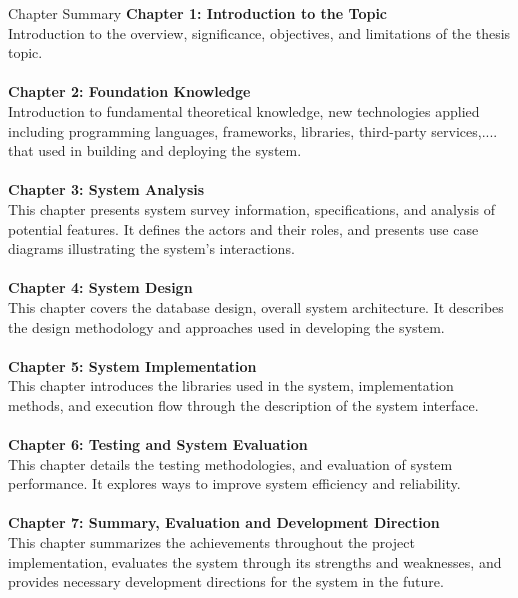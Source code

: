 \begin{preface}{Chapter Summary}
  \textbf{Chapter 1: Introduction to the Topic}
  \\
  Introduction to the overview, significance, objectives, and limitations of the thesis topic.
  \\
  \\
  \textbf{Chapter 2: Foundation Knowledge}
  \\
  Introduction to fundamental theoretical knowledge, new technologies applied including programming languages, frameworks, libraries, third-party services,.... that used in building and deploying the system.
  \\
  \\
  \textbf{Chapter 3: System Analysis}
  \\
  This chapter presents system survey information, specifications, and analysis of potential features. It defines the actors and their roles, and presents use case diagrams illustrating the system's interactions.
  \\
  \\
  \textbf{Chapter 4: System Design}
  \\
  This chapter covers the database design, overall system architecture. It describes the design methodology and approaches used in developing the system.
  \\
  \\
  \textbf{Chapter 5: System Implementation}
  \\
  This chapter introduces the libraries used in the system, implementation methods, and execution flow through the description of the system interface.
  \\
  \\
  \textbf{Chapter 6: Testing and System Evaluation}
  \\
  This chapter details the testing methodologies, and evaluation of system performance. It explores ways to improve system efficiency and reliability.
  \\
  \\
  \textbf{Chapter 7: Summary, Evaluation and Development Direction}
  \\
  This chapter summarizes the achievements throughout the project implementation, evaluates the system through its strengths and weaknesses, and provides necessary development directions for the system in the future.
  \end{preface}